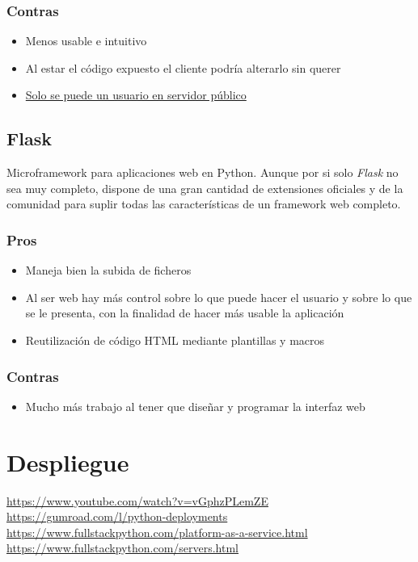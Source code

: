 \subsubsection{Contras}
\begin{itemize}
	\item Menos usable e intuitivo
	\item Al estar el código expuesto el cliente podría alterarlo sin querer
	\item \href{http://jupyter-notebook.readthedocs.io/en/latest/public_server.html}{Solo se puede un usuario en servidor público}
\end{itemize}

\subsection{Flask}
Microframework para aplicaciones web en Python. Aunque por si solo \textit{Flask} no sea muy completo, dispone de una gran cantidad de extensiones oficiales y de la comunidad para suplir todas las características de un framework web completo.
\subsubsection{Pros}
\begin{itemize}
	\item Maneja bien la subida de ficheros
	\item Al ser web hay más control sobre lo que puede hacer el usuario y sobre lo que se le presenta, con la finalidad de hacer más usable la aplicación
	\item Reutilización de código HTML mediante plantillas y macros
\end{itemize}
\subsubsection{Contras}
\begin{itemize}
	\item Mucho más trabajo al tener que diseñar y programar la interfaz web
\end{itemize}

\section{Despliegue}
\url{https://www.youtube.com/watch?v=vGphzPLemZE}\\
\url{https://gumroad.com/l/python-deployments}\\
\url{https://www.fullstackpython.com/platform-as-a-service.html}\\
\url{https://www.fullstackpython.com/servers.html}
